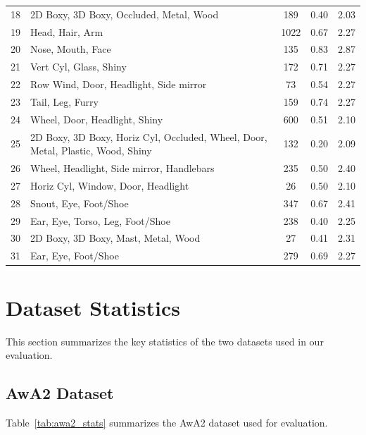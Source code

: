 \begin{table}[H]
{\begin{tabular}{clccc}
            18 & 2D Boxy, 3D Boxy, Occluded, Metal, Wood & 189 & 0.40 & 2.03 \\
            19 & Head, Hair, Arm & 1022 & 0.67 & 2.27 \\
            20 & Nose, Mouth, Face & 135 & 0.83 & 2.87 \\
            21 & Vert Cyl, Glass, Shiny & 172 & 0.71 & 2.27 \\
            22 & Row Wind, Door, Headlight, Side mirror & 73 & 0.54 & 2.27 \\
            23 & Tail, Leg, Furry & 159 & 0.74 & 2.27 \\
            24 & Wheel, Door, Headlight, Shiny & 600 & 0.51 & 2.10 \\
            25 & 2D Boxy, 3D Boxy, Horiz Cyl, Occluded, Wheel, Door, Metal, Plastic, Wood, Shiny & 132 & 0.20 & 2.09 \\
            26 & Wheel, Headlight, Side mirror, Handlebars & 235 & 0.50 & 2.40 \\
            27 & Horiz Cyl, Window, Door, Headlight & 26 & 0.50 & 2.10 \\
            28 & Snout, Eye, Foot/Shoe & 347 & 0.67 & 2.41 \\
            29 & Ear, Eye, Torso, Leg, Foot/Shoe & 238 & 0.40 & 2.25 \\
            30 & 2D Boxy, 3D Boxy, Mast, Metal, Wood & 27 & 0.41 & 2.31 \\
            31 & Ear, Eye, Foot/Shoe & 279 & 0.69 & 2.27 \\
            \bottomrule
        \end{tabular}
    }
\end{table}

\section{Dataset Statistics}

This section summarizes the key statistics of the two datasets used in our evaluation.

\subsection{AwA2 Dataset}

Table~\ref{tab:awa2_stats} summarizes the AwA2 dataset used for evaluation.

